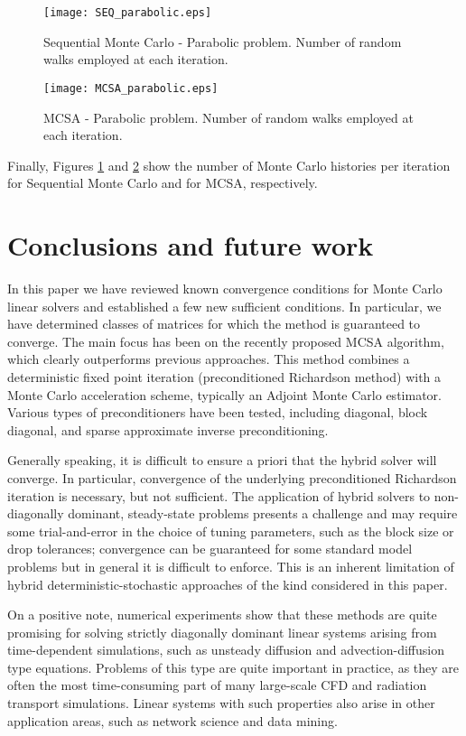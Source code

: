 \documentclass[final,leqno,onefignum,onetabnum]{siamltex1213}
\begin{document}
\begin{figure}
  \centering
    \texttt{[image: SEQ\_parabolic.eps]}
      \caption{Sequential Monte Carlo - Parabolic problem. Number of random
walks
employed at each
iteration.}
\label{SEQ_parabolic}
\end{figure}


\begin{figure}
  \centering
    \texttt{[image: MCSA\_parabolic.eps]}
      \caption{MCSA - Parabolic problem. Number of random walks
employed at each
iteration.}
\label{MCSA_parabolic}
\end{figure}

Finally, Figures \ref{SEQ_parabolic} and \ref{MCSA_parabolic}
show the number of Monte Carlo histories per iteration
for Sequential Monte Carlo
and for MCSA, respectively.

\section{Conclusions and future work}
\label{sec:conclusion}

In this paper we have reviewed known convergence conditions for Monte Carlo linear
solvers and established a few new sufficient conditions. In particular, we
have determined classes of matrices for which the method  is guaranteed
to converge. The main focus has
been on the recently proposed MCSA algorithm, which clearly outperforms
previous approaches. This method combines a deterministic fixed point
iteration (preconditioned Richardson method) with a Monte Carlo
acceleration scheme, typically an Adjoint Monte Carlo estimator. Various
types of preconditioners have been tested, including diagonal, block
diagonal, and sparse approximate inverse preconditioning.

Generally speaking, it is difficult to ensure a priori that the
hybrid solver will converge. In particular, convergence of the underlying
preconditioned Richardson iteration is necessary, but not sufficient.
The application of hybrid solvers to non-diagonally dominant, steady-state
problems presents a challenge and may require some trial-and-error in the
choice of tuning parameters, such as the block size or drop tolerances;
convergence can be guaranteed for some standard model problems but in
general it is difficult to enforce.
This is an inherent limitation of hybrid deterministic-stochastic
approaches of the kind considered in this paper.

On a positive note, numerical experiments show that these methods
are quite promising for solving strictly diagonally dominant linear systems
arising from time-dependent simulations, such as unsteady diffusion and
advection-diffusion type equations. Problems of this type are quite
important in practice, as they are often the most time-consuming part
of many large-scale CFD and radiation transport simulations.
Linear systems with such properties also arise in other application areas,
such as network science and data mining.
\end{document}
